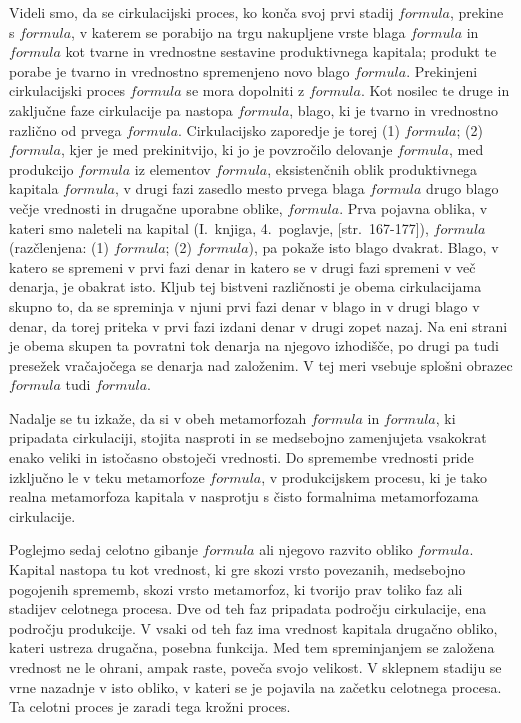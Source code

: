 \documentclass[a5paper]{scrbook}
\begin{document}
Videli smo, da se cirkulacijski proces, ko konča svoj prvi stadij \( formula \), prekine s \( formula \), v katerem se porabijo na trgu nakupljene vrste blaga \( formula \) in \( formula \) kot tvarne in vrednostne sestavine produktivnega kapitala; produkt te porabe je tvarno in vrednostno spremenjeno novo blago \( formula \). Prekinjeni cirkulacijski proces \( formula \) se mora dopolniti z \( formula \). Kot nosilec te druge in zaključne faze cirkulacije pa nastopa \( formula \), blago, ki je tvarno in vrednostno različno od prvega \( formula \). Cirkulacijsko zaporedje je torej (1) \( formula \); (2) \( formula \), kjer je med prekinitvijo, ki jo je povzročilo delovanje \( formula \), med produkcijo \( formula \) iz elementov \( formula \), eksistenčnih oblik produktivnega kapitala \( formula \), v drugi fazi zasedlo mesto prvega blaga \( formula \) drugo blago večje vrednosti in drugačne uporabne oblike, \( formula \). Prva pojavna oblika, v kateri smo naleteli na kapital (I.~knjiga, 4.~poglavje, [str.\ 167-177]), \( formula \) (razčlenjena: (1) \( formula \); (2) \( formula \)), pa pokaže isto blago dvakrat. Blago, v katero se spremeni v prvi fazi denar in katero se v drugi fazi spremeni v več denarja, je obakrat isto. Kljub tej bistveni različnosti je obema cirkulacijama skupno to, da se spreminja v njuni prvi fazi denar v blago in v drugi blago v denar, da torej priteka v prvi fazi izdani denar v drugi zopet nazaj. Na eni strani je obema skupen ta povratni tok denarja na njegovo izhodišče, po drugi pa tudi presežek vračajočega se denarja nad založenim. V tej meri vsebuje splošni obrazec \( formula \) tudi \( formula \).

Nadalje se tu izkaže, da si v obeh metamorfozah \( formula \) in \( formula \), ki pripadata cirkulaciji, stojita nasproti in se medsebojno zamenjujeta vsakokrat enako veliki in istočasno obstoječi vrednosti. Do spremembe vrednosti pride izključno le v teku metamorfoze \( formula \), v produkcijskem procesu, ki je tako realna metamorfoza kapitala v nasprotju s čisto formalnima metamorfozama cirkulacije.

Poglejmo sedaj celotno gibanje \( formula \) ali njegovo razvito obliko \( formula \). Kapital nastopa tu kot vrednost, ki gre skozi vrsto povezanih, medsebojno pogojenih sprememb, skozi vrsto metamorfoz, ki tvorijo prav toliko faz ali stadijev celotnega procesa. Dve od teh faz pripadata področju cirkulacije, ena področju produkcije. V vsaki od teh faz ima vrednost kapitala drugačno obliko, kateri ustreza drugačna, posebna funkcija. Med tem spreminjanjem se založena vrednost ne le ohrani, ampak raste, poveča svojo velikost. V sklepnem stadiju se vrne nazadnje v isto obliko, v kateri se je pojavila na začetku celotnega procesa. Ta celotni proces je zaradi tega krožni proces.
\end{document}
